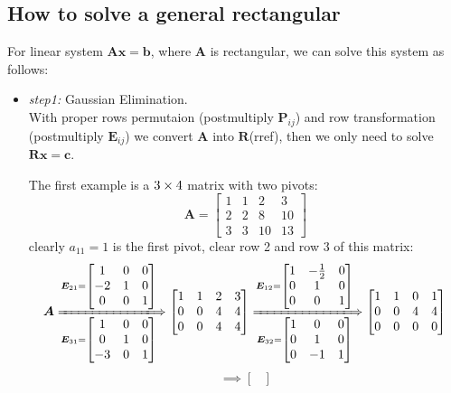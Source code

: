 \subsection{How to solve a general rectangular}
For linear system $\bm{Ax} = \bm b$, where $\bm A$ is rectangular, we can solve this system as follows:\\
\begin{itemize}
\item
\emph{step1: }Gaussian Elimination.\\
With proper rows permutaion (postmultiply $\bm P_{ij}$) and row transformation (postmultiply $\bm E_{ij}$) we convert $\bm A$ into $\bm R$(rref), then we only need to solve $\bm{Rx} = \bm c$.
\begin{example}
The first example is a $3\times 4$ matrix with two pivots:
\[
\bm A = \begin{bmatrix}
1&1&2&3\\2&2&8&10\\3&3&10&13
\end{bmatrix}
\]
clearly $a_{11}=1$ is the first pivot, clear row 2 and row 3 of this matrix:
\[
\bm A
\xLongrightarrow[\bm E_{31} = \begin{bmatrix}
1&0&0\\0&1&0\\-3&0&1
\end{bmatrix}]{\bm E_{21} = \begin{bmatrix}
1&0&0\\-2&1&0\\0&0&1
\end{bmatrix}}
\begin{bmatrix}
1&1&2&3\\0&0&4&4\\0&0&4&4
\end{bmatrix}
\xLongrightarrow[\bm E_{32} = \begin{bmatrix}
1&0&0\\0&1&0\\0&-1&1
\end{bmatrix}]{\bm E_{12} = \begin{bmatrix}
1&-\frac{1}{2}&0\\0&1&0\\0&0&1
\end{bmatrix}}
\begin{bmatrix}
1&1&0&1\\0&0&4&4\\0&0&0&0
\end{bmatrix}\\
\]
\[\implies \begin{bmatrix}

\end{bmatrix}\]
\end{example}
\end{itemize}
